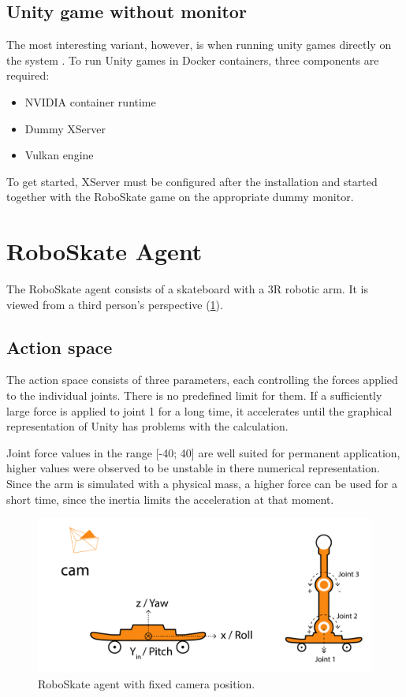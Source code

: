 \documentclass[conference]{IEEEtran}
\begin{document}
\subsection{Unity game without monitor}
The most interesting variant, however, is when running unity games directly on the system \cite{unitywithoutMonitor}. To run Unity games in Docker containers, three components are required:


\begin{itemize}
    \item NVIDIA container runtime \cite{nvidiagpucontainersruntime}
    \item Dummy XServer \cite{ServerGUI}
    \item Vulkan engine \cite{nvidiavulkan}
\end{itemize}
To get started, XServer must be configured after the installation and started together with the RoboSkate game on the appropriate dummy monitor.

\section{RoboSkate Agent}  \label{RoboSkate_Agent}
The RoboSkate agent consists of a skateboard with a 3R robotic arm. It is viewed from a third person's perspective (\figurename  \ref{fig:RoboSkate_agent}).

\subsection{Action space}
The action space consists of three parameters, each controlling the forces applied to the individual joints. There is no predefined limit for them. If a sufficiently large force is applied to joint 1 for a long time, it accelerates until the graphical representation of Unity has problems with the calculation.

Joint force values in the range [-40; 40] are well suited for permanent application, higher values were observed to be unstable in there numerical representation. Since the arm is simulated with a physical mass, a higher force can be used for a short time, since the inertia limits the acceleration at that moment.

\begin{figure}[!t]
  \centering
  \includegraphics[width=.9\linewidth]{images/RoboSkateBord.png}
  \caption{RoboSkate agent with fixed camera position.}
  \label{fig:RoboSkate_agent}
\end{figure}
\end{document}
